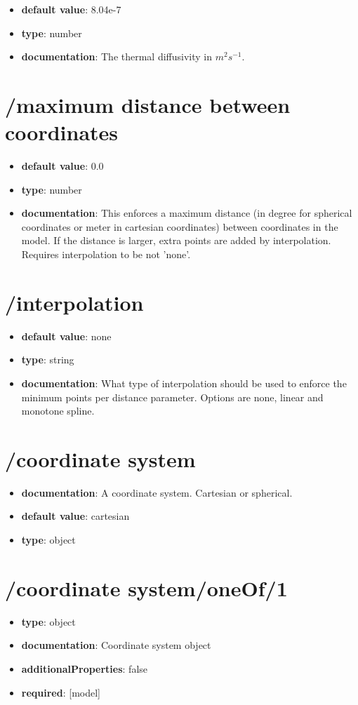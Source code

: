 \begin{itemize}\item {\bf default value}: 8.04e-7
\item {\bf type}: number
\item {\bf documentation}: The thermal diffusivity in $m^{2} s^{-1}$.
\end{itemize}\section{/maximum distance between coordinates}
\begin{itemize}\item {\bf default value}: 0.0
\item {\bf type}: number
\item {\bf documentation}: This enforces a maximum distance (in degree for spherical coordinates or meter in cartesian coordinates) between coordinates in the model. If the distance is larger, extra points are added by interpolation. Requires interpolation to be not 'none'.
\end{itemize}\section{/interpolation}
\begin{itemize}\item {\bf default value}: none
\item {\bf type}: string
\item {\bf documentation}: What type of interpolation should be used to enforce the minimum points per distance parameter. Options are none, linear and monotone spline.
\end{itemize}\section{/coordinate system}
\begin{itemize}\item {\bf documentation}: A coordinate system. Cartesian or spherical.
\item {\bf default value}: cartesian
\item {\bf type}: object
\end{itemize}
\section{/coordinate system/oneOf/1}
\begin{itemize}\item {\bf type}: object
\item {\bf documentation}: Coordinate system object
\item {\bf additionalProperties}: false
\item {\bf required}: [model]\end{itemize}

